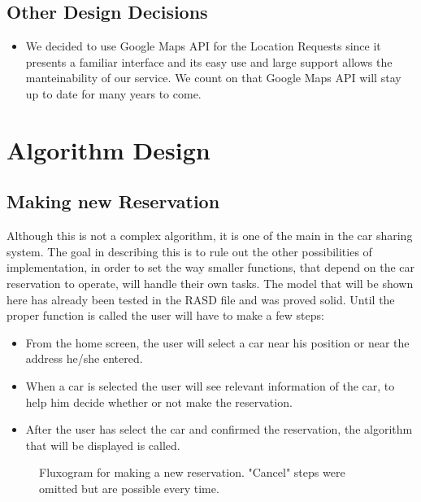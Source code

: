 \documentclass[a4paper]{article}
\begin{document}
\subsection{Other Design Decisions}
\begin{itemize} 
\item We decided to use Google Maps API for the Location Requests since it presents a familiar interface and its easy use and large support allows the manteinability of our service. We count on that Google Maps API will stay up to date for many years to come.
\end{itemize}


\newpage
\section{Algorithm Design}
\subsection{Making new Reservation}

Although this is not a complex algorithm, it is one of the main in the car sharing system. The goal in describing this is to rule out the other possibilities of implementation, in order to set the way smaller functions, that depend on the car reservation to operate, will handle their own tasks. The model that will be shown here has already been tested in the RASD file and was proved solid. \newline
Until the proper function is called the user will have to make a few steps:
\begin{itemize} 
\item From the home screen, the user will select a car near his position or near the address he/she entered.
\item  When a car is selected the user will see relevant information of the car, to help him decide whether or not make the reservation.
\item After the user has select the car and confirmed the reservation, the algorithm that will be displayed is called.
\end{itemize}
\begin{figure}[h]
\centering
\vspace*{\fill}
\noindent{}%
\caption {Fluxogram for making a new reservation. "Cancel" steps were omitted but are possible every time.}
\vspace*{0.2cm}
\end{figure}
\end{document}
